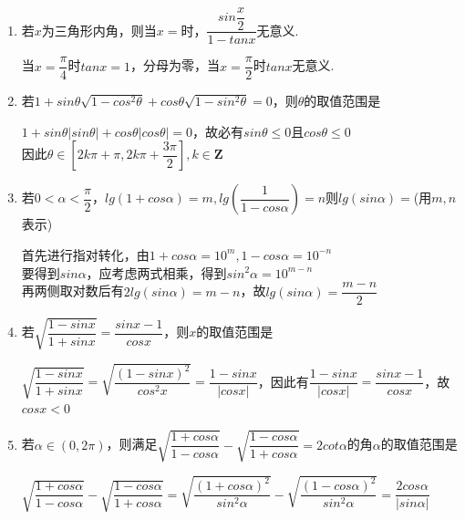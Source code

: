 \begin{enumerate}
\begin{enumerate}
\begin{jieda}
        \end{jieda}
        \item 若$x$为三角形内角，则当$x = $时，$\dfrac{sin\dfrac{x}{2}}{1-tanx}$无意义.
        \begin{jieda}
            当$x = \dfrac{\pi}{4}$时$tanx = 1$，分母为零，当$x = \dfrac{\pi}{2}$时$tanx$无意义.
        \end{jieda}
        \item 若$1+sin\theta\sqrt{1 - cos^2\theta} + cos\theta\sqrt{1-sin^2\theta} = 0$，则$\theta$的取值范围是
        \begin{jieda}
            $1 + sin\theta |sin\theta| + cos\theta |cos\theta| = 0$，故必有$sin\theta \leq 0$且$cos\theta \leq 0$ \\
            因此$\theta \in [2k\pi + \pi, 2k\pi + \dfrac{3\pi}{2}], k \in \mathbf{Z}$
        \end{jieda}
        \item 若$0 < \alpha < \dfrac{\pi}{2}$，$lg(1+cos\alpha) = m, lg\left(\dfrac{1}{1-cos\alpha}\right) = n$则$lg(sin\alpha) = $(用$m, n$表示)
        \begin{jieda}
            首先进行指对转化，由$1+cos\alpha = 10^m, 1-cos\alpha = 10^{-n}$ \\
            要得到$sin\alpha$，应考虑两式相乘，得到$sin^2\alpha = 10^{m-n}$ \\
            再两侧取对数后有$2lg(sin\alpha) = m - n$，故$lg(sin\alpha) = \dfrac{m-n}{2}$
        \end{jieda}
        \item 若$\sqrt{\dfrac{1-sinx}{1+sinx}} = \dfrac{sinx - 1}{cosx}$，则$x$的取值范围是
        \begin{jieda}
            $\sqrt{\dfrac{1-sinx}{1+sinx}} = \sqrt{\dfrac{(1-sinx)^2}{cos^2x}} = \dfrac{1-sinx}{|cosx|}$，因此有$\dfrac{1-sinx}{|cosx|} = \dfrac{sinx - 1}{cosx}$，故$cosx < 0$
        \end{jieda}
        \item 若$\alpha \in (0, 2\pi)$，则满足$\sqrt{\dfrac{1+cos\alpha}{1-cos\alpha}} - \sqrt{\dfrac{1-cos\alpha}{1+cos\alpha}} = 2cot\alpha$的角$\alpha$的取值范围是
        \begin{jieda}
            $\sqrt{\dfrac{1+cos\alpha}{1-cos\alpha}} - \sqrt{\dfrac{1-cos\alpha}{1+cos\alpha}} = \sqrt{\dfrac{(1+cos\alpha)^2}{sin^2\alpha}} - \sqrt{\dfrac{(1-cos\alpha)^2}{sin^2\alpha}} = \dfrac{2cos\alpha}{|sin\alpha|}$ \\

\end{jieda}
\end{enumerate}
\end{enumerate}
